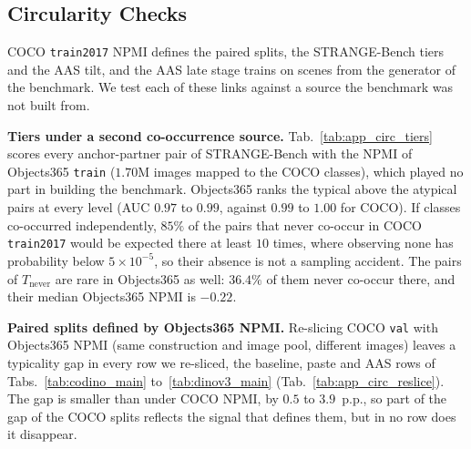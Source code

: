 \subsection{Circularity Checks}
\label{app:circularity}

\noindent COCO \texttt{train2017} NPMI defines the paired splits, the STRANGE-Bench tiers and the AAS tilt, and the AAS late stage trains on scenes from the generator of the benchmark. We test each of these links against a source the benchmark was not built from.

\noindent\textbf{Tiers under a second co-occurrence source.} Tab.~\ref{tab:app_circ_tiers} scores every anchor-partner pair of STRANGE-Bench with the NPMI of Objects365 \texttt{train} ($1.70$M images mapped to the COCO classes), which played no part in building the benchmark. Objects365 ranks the typical above the atypical pairs at every level (AUC $0.97$ to $0.99$, against $0.99$ to $1.00$ for COCO). If classes co-occurred independently, $85\%$ of the pairs that never co-occur in COCO \texttt{train2017} would be expected there at least $10$ times, where observing none has probability below $5{\times}10^{-5}$, so their absence is not a sampling accident. The pairs of $T_{\text{never}}$ are rare in Objects365 as well: $36.4\%$ of them never co-occur there, and their median Objects365 NPMI is $-0.22$.

\begin{table}[!htp]%
\centering
\footnotesize
\setlength{\tabcolsep}{4pt}
\renewcommand{\arraystretch}{0.9}
\caption{\textbf{STRANGE-Bench tiers under Objects365 NPMI.} Objects365, which played no part in building the benchmark, ranks the typical above the atypical pairs at every level (AUC $0.97$ to $0.99$), and $36.4\%$ of the $T_{\text{never}}$ pairs never co-occur there either. Anchor-partner pairs of every scene scored with COCO \texttt{train2017} NPMI, which defines the tiers, and with Objects365 \texttt{train} NPMI; a pair that never co-occurs in a source is scored $-1$. NPMI: median over the typical / atypical arm of a level; $N_{ij}{=}0$: share of atypical pairs that never co-occur in the source; AUC: probability that a typical pair outranks an atypical pair of the same level.}
\label{tab:app_circ_tiers}

\end{table}

\noindent\textbf{Paired splits defined by Objects365 NPMI.} Re-slicing COCO \texttt{val} with Objects365 NPMI (same construction and image pool, different images) leaves a typicality gap in every row we re-sliced, the baseline, paste and AAS rows of Tabs.~\ref{tab:codino_main} to~\ref{tab:dinov3_main} (Tab.~\ref{tab:app_circ_reslice}). The gap is smaller than under COCO NPMI, by $0.5$ to $3.9$~p.p.\@, so part of the gap of the COCO splits reflects the signal that defines them, but in no row does it disappear.


